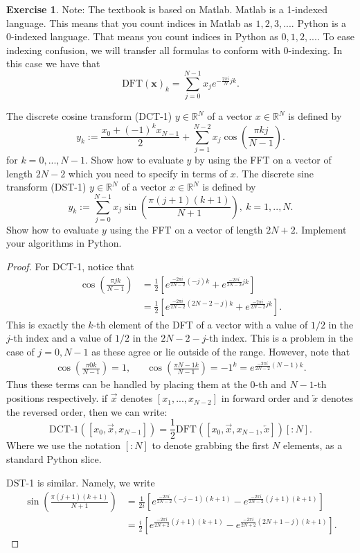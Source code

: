 \documentclass{amsart}
\theoremstyle{plain}
\theoremstyle{definition}
\newtheorem{exer}{Exercise}[section]
\newcommand{\R}{\mathbb{R}}
\begin{document}
\begin{exer}
    Note: The textbook is based on Matlab. Matlab is a 1-indexed language. This means that you count indices in Matlab as $1,2,3,...$. Python is a 0-indexed language. That means you count indices in Python as $0,1,2,...$. To ease indexing confusion, we will transfer all formulas to conform with 0-indexing. 
    In this case we have that 
    $$\text{DFT}(\mathbf{x})_k = \sum_{j=0}^{N-1} x_j e^{-\frac{2\pi i}{N} jk}.$$
    \par The discrete cosine transform (DCT-1) $y\in \R^N$ of a vector $x \in \R^N$ is defined by
    $$y_k := \frac{x_0 + \left(-1\right)^{k}x_{N-1}}{2} + \sum_{j=1}^{N-2} x_j \cos\left(\frac{\pi k j}{N-1}\right).$$
    for $k=0,...,N-1$. Show how to evaluate $y$ by using the FFT on a vector of length $2N-2$ which you need to specify in terms of $x$.
     The discrete sine transform (DST-1) $y\in \R^N$ of a vector $x \in \R^N$ is defined by
     $$y_k := \sum_{j=0}^{N-1} x_j \sin\left(\frac{\pi (j+1)(k+1)}{N+1}\right), \ k=1,..,N.$$
     Show how to evaluate $y$ using the FFT on a vector of length $2N+2$. Implement your algorithms in Python. 
\end{exer}
\begin{proof}
   For DCT-1, notice that
   \begin{align*}
       \cos\left(\frac{\pi j k}{N-1}\right) &= \frac{1}{2}\left[e^{\frac{-2\pi i }{2N-2} \left(-j\right)k}+e^{\frac{-2\pi i }{2N-2} jk} \right]\\
       &= \frac{1}{2}\left[e^{\frac{-2\pi i }{2N-2} \left(2N-2-j\right)k}+e^{\frac{-2\pi i }{2N-2} jk} \right].
   \end{align*}
   This is exactly the $k$-th element of the DFT of a vector with a value of $1/2$ in the $j$-th index and a value of $1/2$ in the $2N-2-j$-th index. This is a problem in the case of $j=0,N-1$ as these agree or lie outside of the range. However, note that 
   \begin{align*}
     \cos\left(\frac{\pi 0 k}{N-1}\right) = 1, && \cos\left(\frac{\pi N-1 k}{N-1}\right) = -1^k = e^{\frac{-2\pi i}{2N-2} (N-1)k}.  
   \end{align*}
   Thus these terms can be handled by placing them at the $0$-th and $N-1$-th positions respectively. if $\overrightarrow{x}$ denotes $[x_1,...,x_{N-2}]$ in forward order and $\overleftarrow{x}$ denotes the reversed order, then we can write:
   $$\text{DCT-1}\left([x_0,\overrightarrow{x},x_{N-1}]\right) = \frac{1}{2} \text{DFT}\left([x_0,\overrightarrow{x},x_{N-1},\overleftarrow{x}]\right)[:N].$$
   Where we use the notation $[:N]$ to denote grabbing the first $N$ elements, as a standard Python slice. 
   \par DST-1 is similar. Namely, we write
   \begin{align*}
       \sin\left(\frac{\pi (j+1) (k+1)}{N+1}\right) &= \frac{1}{2i}\left[e^{\frac{-2\pi i }{2N-2} \left(-j-1\right)(k+1)}-e^{\frac{-2\pi i }{2N-2} (j+1)(k+1)} \right]\\
       &= \frac{i}{2}\left[e^{\frac{-2\pi i }{2N+2} (j+1)(k+1)} -e^{\frac{-2\pi i }{2N+2} \left(2N+1-j\right)(k+1)}\right].
   \end{align*}
\end{proof}
\end{document}
